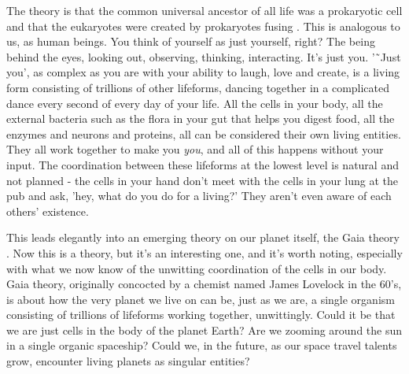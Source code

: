 The theory is that the common universal ancestor of all life was a prokaryotic cell and that the eukaryotes were created by prokaryotes fusing \cite{ProcaEuka}.
This is analogous to us, as human beings. You think of yourself as just yourself, right? The being behind the eyes, looking out, observing, thinking, interacting.
It's just you.
'˜Just you', as complex as you are with your ability to laugh, love and create, is a living form consisting of trillions of other lifeforms, dancing together in a complicated dance every second of every day of your life.
All the cells in your body, all the external bacteria such as the flora in your gut that helps you digest food, all the enzymes and neurons and proteins, all can be considered their own living entities.
They all work together to make you \textit{you}, and all of this happens without your input.
The coordination between these lifeforms at the lowest level is natural and not planned - the cells in your hand don't meet with the cells in your lung at the pub and ask, 'hey, what do you do for a living?'
They aren't even aware of each others' existence.

This leads elegantly into an emerging theory on our planet itself, the Gaia theory \cite{Lovelock}.
Now this is a theory, but it's an interesting one, and it's worth noting, especially with what we now know of the unwitting coordination of the cells in our body.
Gaia theory, originally concocted by a chemist named James Lovelock in the 60's, is about how the very planet we live on can be, just as we are, a single organism consisting of trillions of lifeforms working together, unwittingly.
Could it be that we are just cells in the body of the planet Earth?
Are we zooming around the sun in a single organic spaceship?
Could we, in the future, as our space travel talents grow, encounter living planets as singular entities?